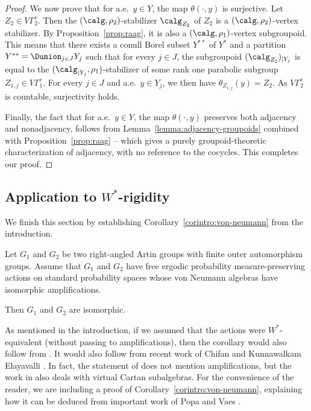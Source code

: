 \begin{proof}
We now prove that for a.e.\ $y\in Y$, the map $\theta(\cdot,y)$ is surjective. Let $Z_2\in V\Gamma^e_2$. Then the $(\calg,\rho_2)$-stabilizer $\calg_{Z_2}$ of $Z_2$ is a $(\calg,\rho_2)$-vertex stabilizer. By Proposition~\ref{prop:raag}, it is also a $(\calg,\rho_1)$-vertex subgroupoid. This means that there exists a conull Borel subset $Y^{**}$ of $Y^*$ and a partition $Y^{**}=\Dunion_{j\in J} Y_j$ such that for every $j\in J$, the subgroupoid $(\calg_{Z_2})_{|Y_j}$ is equal to the $(\calg_{|Y_j},\rho_1)$-stabilizer of some rank one parabolic subgroup $Z_{1,j}\in V\Gamma_1^e$. For every $j\in J$ and a.e.\ $y\in Y_j$, we then have $\theta_{Z_{1,j}}(y)=Z_2$. As $V\Gamma_2^e$ is countable, surjectivity holds.

Finally, the fact that for a.e.\ $y\in Y$, the map $\theta(\cdot,y)$ preserves both adjacency and nonadjacency, follows from Lemma~\ref{lemma:adjacency-groupoids} combined with Proposition~\ref{prop:raag} -- which gives a purely groupoid-theoretic characterization of adjacency, with no reference to the cocycles. This completes our proof.
\end{proof}

\subsection{Application to $W^*$-rigidity}\label{sec:von-neumann}

We finish this section by establishing Corollary~\ref{corintro:von-neumann} from the introduction.

\begin{cor}
\label{cor:von-neumann}
Let $G_1$ and $G_2$ be two right-angled Artin groups with finite outer automorphism groups. Assume that $G_1$ and $G_2$ have free ergodic probability measure-preserving actions on standard probability spaces whose von Neumann algebras have isomorphic amplifications.

Then $G_1$ and $G_2$ are isomorphic.
\end{cor}

As mentioned in the introduction, if we assumed that the actions were $W^*$\nobreakdash-equi\-valent (without passing to amplifications), then the corollary would also follow from \cite[Cor.\,4.2]{HHL}. It would also follow from recent work of Chifan and Kunnawalkam Elayavalli \cite[Th.\,1.3]{CE}. In fact, the statement of \cite[Th.\,1.3]{CE} does not mention amplifications, but the work in \cite[Th.\,3.1]{CE} also deals with virtual Cartan subalgebras. For the convenience of the reader, we are including a proof of Corollary~\ref{corintro:von-neumann}, explaining how it can be deduced from important work of Popa and Vaes \cite{PV1}.

